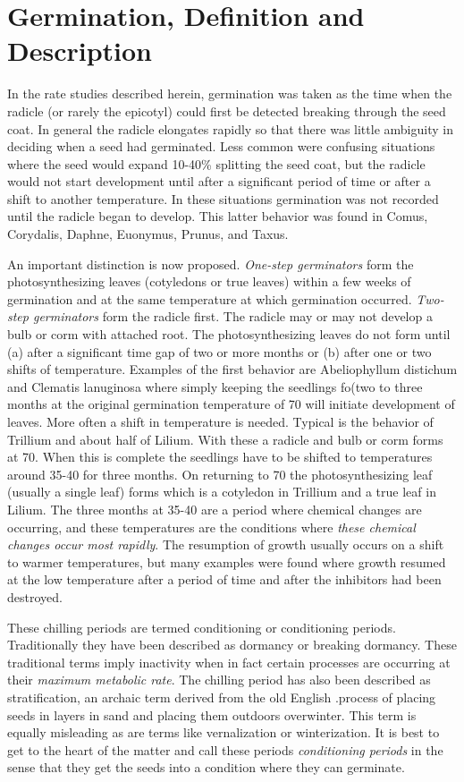 \chapter{Germination, Definition and Description}

In the rate studies described herein, germination was taken as the time when
the radicle (or rarely the epicotyl) could first be detected breaking through the seed
coat. In general the radicle elongates rapidly so that there was little ambiguity in
deciding when a seed had germinated. Less common were confusing situations
where the seed would expand 10-40\% splitting the seed coat, but the radicle would
not start development until after a significant period of time or after a shift to another
temperature. In these situations germination was not recorded until the radicle began
to develop. This latter behavior was found in Comus, Corydalis, Daphne, Euonymus,
Prunus, and Taxus.

An important distinction is now proposed. \textit{One-step germinators} form the
photosynthesizing leaves (cotyledons or true leaves) within a few weeks of
germination and at the same temperature at which germination occurred. \textit{Two-step
germinators} form the radicle first. The radicle may or may not develop a bulb or corm
with attached root. The photosynthesizing leaves do not form until (a) after a
significant time gap of two or more months or (b) after one or two shifts of temperature.
Examples of the first behavior are Abeliophyllum distichum and Clematis lanuginosa
where simply keeping the seedlings fo(two to three months at the original germination
temperature of 70 will initiate development of leaves. More often a shift in temperature
is needed. Typical is the behavior of Trillium and about half of Lilium. With these a
radicle and bulb or corm forms at 70. When this is complete the seedlings have to be
shifted to temperatures around 35-40 for three months. On returning to 70 the
photosynthesizing leaf (usually a single leaf) forms which is a cotyledon in Trillium and
a true leaf in Lilium. The three months at 35-40 are a period where chemical changes
are occurring, and these temperatures are the conditions where \textit{these chemical
changes occur most rapidly}. The resumption of growth usually occurs on a shift to
warmer temperatures, but many examples were found where growth resumed at the
low temperature after a period of time and after the inhibitors had been destroyed.

These chilling periods are termed conditioning or conditioning periods.
Traditionally they have been described as dormancy or breaking dormancy. These
traditional terms imply inactivity when in fact certain processes are occurring at their
\textit{maximum metabolic rate}. The chilling period has also been described as stratification,
an archaic term derived from the old English .process of placing seeds in layers in
sand and placing them outdoors overwinter. This term is equally misleading as are
terms like vernalization or winterization. It is best to get to the heart of the matter and
call these periods \textit{conditioning periods} in the sense that they get the seeds into a
condition where they can germinate.

